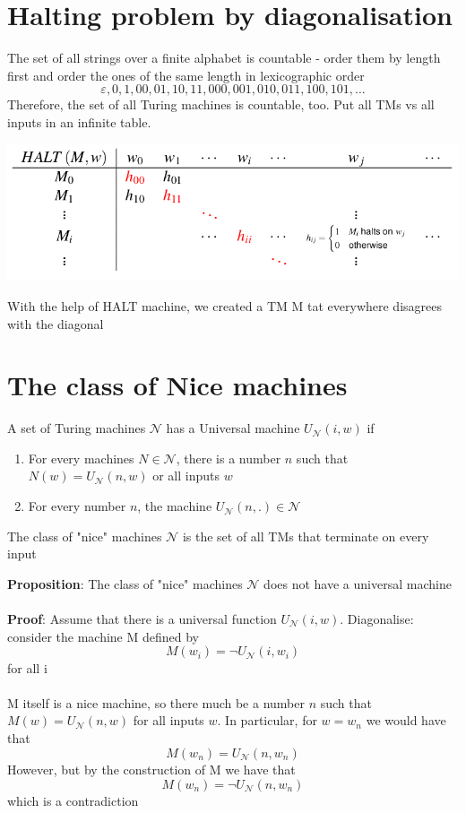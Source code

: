 \documentclass{article}[18pt]
\begin{document}
\section{Halting problem by diagonalisation}
The set of all strings over a finite alphabet is countable - order them by length first and order the ones of the same length in lexicographic order
\[
\varepsilon, 0,1,00,01,10,11,000,001,010,011,100,101, \ldots
\]
Therefore, the set of all Turing machines is countable, too. Put all TMs vs all inputs in an infinite table.
\begin{center}
	\includegraphics[scale=0.7]{Halting}
\end{center}
With the help of HALT machine, we created a TM M tat everywhere disagrees with the diagonal
\section{The class of Nice machines}
A set of Turing machines $\mathscr{N}$ has a Universal machine $U_{\mathscr{N}}(i,w)$ if
\begin{enumerate}
	\item For every machines $N\in \mathscr{N}$, there is a number $n$ such that $N(w)=U_{\mathscr{N}}(n,w)$ or all inputs $w$
	\item For every number $n$, the machine $U_{\mathscr{N}}(n,.)\in \mathscr{N}$
\end{enumerate}
\begin{defin}
The class of "nice" machines $\mathscr{N}$ is the set of all TMs that terminate on every input
\end{defin}
\textbf{Proposition}: The class of "nice" machines $\mathscr{N}$ does not have a universal machine\\
\\
\textbf{Proof}: Assume that there is a universal function $U_{\mathscr{N}}(i,w)$. Diagonalise: consider the machine M defined by
\[
M\left(w_{i}\right)=\neg U_{\mathscr{N}}\left(i, w_{i}\right)
\]
for all i\\
\\
M itself is a nice machine, so there much be a number $n$ such that $M(w)=U_{\mathscr{N}}(n,w)$ for all inputs $w$. In particular, for $w=w_n$ we would have that
\[
M\left(w_{n}\right)=U_{\mathscr{N}}\left(n, w_{n}\right)
\]
However, but by the construction of M we have that
\[
M\left(w_{n}\right)=\neg U_{\mathscr{N}}\left(n, w_{n}\right)
\]
which is a contradiction
\end{document}
